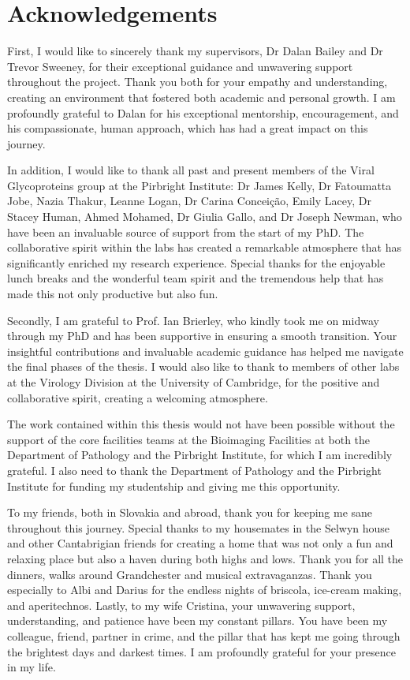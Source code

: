 \chapter{Acknowledgements}
First, I would like to sincerely thank my supervisors, Dr Dalan Bailey and Dr Trevor Sweeney, for their exceptional guidance and unwavering support throughout the project. Thank you both for your empathy and understanding, creating an environment that fostered both academic and personal growth. I am profoundly grateful to Dalan for his exceptional mentorship, encouragement, and his compassionate, human approach, which has had a great impact on this journey. 

In addition, I would like to thank all past and present members of the Viral Glycoproteins group at the Pirbright Institute: Dr James Kelly, Dr Fatoumatta Jobe, Nazia Thakur, Leanne Logan, Dr Carina Conceição, Emily Lacey, Dr Stacey Human, Ahmed Mohamed, Dr Giulia Gallo, and  Dr Joseph Newman, who have been an invaluable source of support from the start of my PhD. The collaborative spirit within the labs has created a remarkable atmosphere that has significantly enriched my research experience. Special thanks for the enjoyable lunch breaks and the wonderful team spirit and the tremendous help that has made this not only productive but also fun.

Secondly, I am grateful to Prof. Ian Brierley, who kindly took me on midway through my PhD and has been supportive in ensuring a smooth transition. Your insightful contributions and invaluable academic guidance has helped me navigate the final phases of the thesis. I would also like to thank to members of other labs at the Virology Division at the University of Cambridge, for the positive and collaborative spirit, creating a welcoming atmosphere.

The work contained within this thesis would not have been possible without the support of the core facilities teams at the Bioimaging Facilities at both the Department of Pathology and the Pirbright Institute, for which I am incredibly grateful. I also need to thank the Department of Pathology and the Pirbright Institute for funding my studentship and giving me this opportunity.

To my friends, both in Slovakia and abroad, thank you for keeping me sane throughout this journey. Special thanks to my housemates in the Selwyn house and other Cantabrigian friends for creating a home that was not only a fun and relaxing place but also a haven during both highs and lows. Thank you for all the dinners, walks around Grandchester and musical extravaganzas. Thank you especially to Albi and Darius for the endless nights of briscola, ice-cream making, and aperitechnos. Lastly, to my wife Cristina, your unwavering support, understanding, and patience have been my constant pillars. You have been my colleague, friend, partner in crime, and the pillar that has kept me going through the brightest days and darkest times. I am profoundly grateful for your presence in my life.

